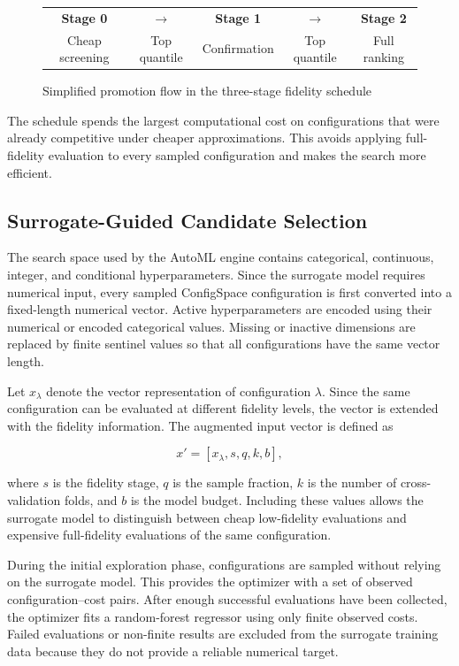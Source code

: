 \documentclass[12pt,a4paper,oneside]{report}
\begin{document}
\begin{figure}[H]
\centering
\renewcommand{\arraystretch}{1.25}
\begin{tabular}{c c c c c}
\textbf{Stage 0} &
\(\longrightarrow\) &
\textbf{Stage 1} &
\(\longrightarrow\) &
\textbf{Stage 2} \\
Cheap screening &
Top quantile &
Confirmation &
Top quantile &
Full ranking \\
\end{tabular}
\caption{Simplified promotion flow in the three-stage fidelity schedule}
\label{fig:fidelity-promotion-flow}
\end{figure}

\noindent The schedule spends the largest computational cost on configurations that were
already competitive under cheaper approximations. This avoids applying
full-fidelity evaluation to every sampled configuration and makes the search
more efficient.

\subsection{Surrogate-Guided Candidate Selection}

The search space used by the AutoML engine contains categorical,
continuous, integer, and conditional hyperparameters. Since the surrogate model
requires numerical input, every sampled ConfigSpace configuration is first
converted into a fixed-length numerical vector. Active hyperparameters are
encoded using their numerical or encoded categorical values. Missing or inactive
dimensions are replaced by finite sentinel values so that all configurations
have the same vector length.

\noindent Let \(x_{\lambda}\) denote the vector representation of configuration
\(\lambda\). Since the same configuration can be evaluated at different fidelity
levels, the vector is extended with the fidelity information. The augmented
input vector is defined as

\[
x' = [x_{\lambda}, s, q, k, b],
\]

\noindent where \(s\) is the fidelity stage, \(q\) is the sample fraction, \(k\) is the
number of cross-validation folds, and \(b\) is the model budget. Including these
values allows the surrogate model to distinguish between cheap low-fidelity
evaluations and expensive full-fidelity evaluations of the same configuration.

\noindent During the initial exploration phase, configurations are sampled without relying
on the surrogate model. This provides the optimizer with a set of observed
configuration--cost pairs. After enough successful evaluations have been
collected, the optimizer fits a random-forest regressor using only finite
observed costs. Failed evaluations or non-finite results are excluded from the
surrogate training data because they do not provide a reliable numerical target.
\end{document}
